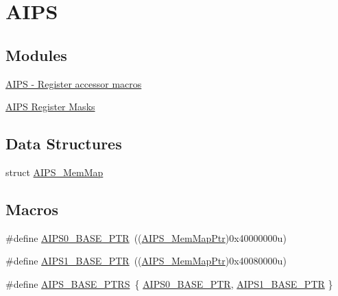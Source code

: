 \hypertarget{group___a_i_p_s___peripheral}{}\section{A\+I\+P\+S}
\label{group___a_i_p_s___peripheral}
\subsection*{Modules}
\begin{DoxyCompactItemize}
\item 
\hyperlink{group___a_i_p_s___register___accessor___macros}{A\+I\+P\+S -\/ Register accessor macros}
\item 
\hyperlink{group___a_i_p_s___register___masks}{A\+I\+P\+S Register Masks}
\end{DoxyCompactItemize}
\subsection*{Data Structures}
\begin{DoxyCompactItemize}
\item 
struct \hyperlink{struct_a_i_p_s___mem_map}{A\+I\+P\+S\+\_\+\+Mem\+Map}
\end{DoxyCompactItemize}
\subsection*{Macros}
\begin{DoxyCompactItemize}
\item 
\#define \hyperlink{group___a_i_p_s___peripheral_ga6affb22d1dff0d01c843913f33f1c1a9}{A\+I\+P\+S0\+\_\+\+B\+A\+S\+E\+\_\+\+P\+T\+R}~((\hyperlink{group___a_i_p_s___peripheral_ga6a37456f1049f1d08787b6ffe1c8a9b3}{A\+I\+P\+S\+\_\+\+Mem\+Map\+Ptr})0x40000000u)
\item 
\#define \hyperlink{group___a_i_p_s___peripheral_gab38278851053aa66f9683ed8707e23bc}{A\+I\+P\+S1\+\_\+\+B\+A\+S\+E\+\_\+\+P\+T\+R}~((\hyperlink{group___a_i_p_s___peripheral_ga6a37456f1049f1d08787b6ffe1c8a9b3}{A\+I\+P\+S\+\_\+\+Mem\+Map\+Ptr})0x40080000u)
\item 
\#define \hyperlink{group___a_i_p_s___peripheral_gacdda032ccd174e1d8c1a02b1e0f7a441}{A\+I\+P\+S\+\_\+\+B\+A\+S\+E\+\_\+\+P\+T\+R\+S}~\{ \hyperlink{group___a_i_p_s___peripheral_ga6affb22d1dff0d01c843913f33f1c1a9}{A\+I\+P\+S0\+\_\+\+B\+A\+S\+E\+\_\+\+P\+T\+R}, \hyperlink{group___a_i_p_s___peripheral_gab38278851053aa66f9683ed8707e23bc}{A\+I\+P\+S1\+\_\+\+B\+A\+S\+E\+\_\+\+P\+T\+R} \}
\end{DoxyCompactItemize}
